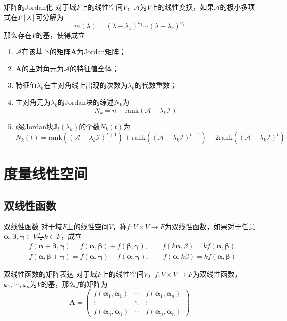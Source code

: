\documentclass[lang = cn, scheme = chinese, thmcnt = section]{elegantbook}
\newcommand{\bs}{\boldsymbol}          %
\newcommand{\rank}{\text{rank}}        %
\begin{document}
\begin{theorem}{矩阵的Jordan化}
	对于域$F$上的线性空间$V$，$\mathscr{A}$为$V$上的线性变换，如果$\mathscr{A}$的极小多项式在$F[\lambda]$可分解为%
	$$
	m(\lambda)=(\lambda-\lambda_1)^{n_1}\cdots(\lambda-\lambda_r)^{n_r}
	$$
	那么存在$V$的基，使得成立
	\begin{enumerate}
		\item $\mathscr{A}$在该基下的矩阵$\bs{A}$为Jordan矩阵；
		\item $\bs{A}$的主对角元为$\mathscr{A}$的特征值全体；
		\item 特征值$\lambda_k$在主对角线上出现的次数为$\lambda_k$的代数重数；
		\item 主对角元为$\lambda_k$的Jordan块的综述$N_k$为
		$$
		N_k=n-\rank(\mathscr{A}-\lambda_k\mathscr{I})
		$$
		\item $t$级Jordan块$\bs{J}_t(\lambda_k)$的个数$N_k(t)$为%
		$$
		N_k(t)=\rank((\mathscr{A}-\lambda_k\mathscr{I})^{t+1})+\rank((\mathscr{A}-\lambda_k\mathscr{I})^{t-1})-2\rank((\mathscr{A}-\lambda_k\mathscr{I})^{t})
		$$
	\end{enumerate}
\end{theorem}

\chapter{度量线性空间}

\section{双线性函数}

\begin{definition}{双线性函数}
	对于域$F$上的线性空间$V$，称$f:V\times V\to F$为双线性函数，如果对于任意$\bs{\alpha},\bs{\beta},\bs{\gamma}\in V$与$k\in F$，成立
	\begin{align*}
		& f(\bs{\alpha}+\bs{\beta},\bs{\gamma})
		=f(\bs{\alpha},\bs{\beta})+f(\bs{\beta},\bs{\gamma}),\qquad
		f(k\bs{\alpha},\beta)=kf(\bs{\alpha},\bs{\beta})\\
		& f(\bs{\alpha},\bs{\beta}+\bs{\gamma})
		=f(\bs{\alpha},\bs{\gamma})+f(\bs{\alpha},\bs{\gamma}),\qquad
		f(\bs{\alpha},k\beta)=kf(\bs{\alpha},\bs{\beta})
	\end{align*}
\end{definition}

\begin{definition}{双线性函数的矩阵表达}
	对于域$F$上的线性空间$V$，$f:V\times V\to F$为双线性函数，$\bs{\varepsilon}_1,\cdots,\bs{\varepsilon}_n$为$V$的基，那么$f$的矩阵为%
	$$
	\bs{A}=\begin{pmatrix}
		f(\bs{\alpha}_1,\bs{\alpha}_1) & \cdots & f(\bs{\alpha}_1,\bs{\alpha}_n)\\
		\vdots & \ddots & \vdots\\
		f(\bs{\alpha}_n,\bs{\alpha}_1) & \cdots & f(\bs{\alpha}_n,\bs{\alpha}_n)
	\end{pmatrix}
	$$
\end{definition}
\end{document}

